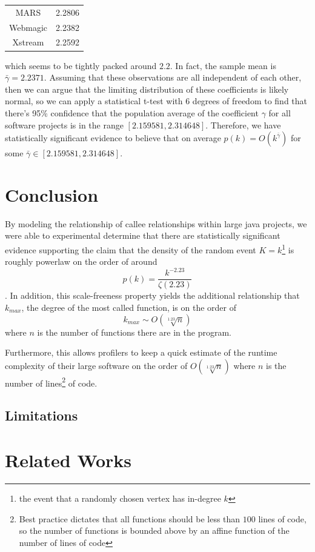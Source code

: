 \documentclass[11pt,a4paper,twocolumn]{article}
\begin{document}
\begin{singlespace}
\begin{table}[H]
\begin{tabular}{|c|c|}
MARS & 2.2806 \\
Webmagic & 2.2382 \\
Xstream & 2.2592 \\ \hline
\end{tabular}
\end{table}
which seems to be tightly packed around $2.2$. In fact, the sample mean is 
$\bar \gamma = 2.2371$. Assuming that these observations are all independent
of each other, then we can argue that the limiting distribution of these coefficients
is likely normal, so we can apply a statistical t-test with 6 degrees of freedom to find
that there's 95\% confidence that the population average of the coefficient $\gamma$ 
for all software projects is in the range $[2.159581, 2.314648]$. Therefore, we have
 statistically significant evidence to believe that on average 
 $p(k) = O(k^{\bar \gamma})$ for some $\bar \gamma \in [2.159581, 2.314648]$.
\section{Conclusion}
By modeling the relationship of callee relationships within large java projects, we were
able to experimental determine that there are statistically significant evidence supporting
the claim that the density of the random event $K = k$\footnote{the event that a randomly
chosen vertex has in-degree $k$} is roughly powerlaw on the order of around 
$$p(k) = \frac{k^{-2.23}}{\zeta(2.23)}$$. In addition, this scale-freeness property yields 
the additional relationship that $k_{max}$, the degree of the most called function, is on the order of 
$$k_{max} \sim O(\sqrt[1.23]{n})$$ where $n$ is the number of functions there are in the program.

Furthermore, this allows profilers to keep a quick estimate of the runtime complexity 
of their large software on the order of $O(\sqrt[1.23]{n})$ where $n$ is the number of 
lines\footnote{Best practice dictates that all functions should be less than $100$ lines
of code, so the number of functions is bounded above by an affine function of
the number of lines of code} of code.
\subsection*{Limitations}

\section{Related Works}






\end{singlespace}
\end{document}
